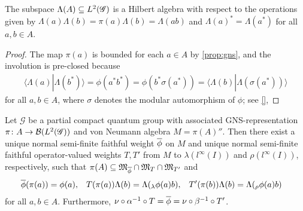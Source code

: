\begin{Lem} \label{lemma:hilbert-algebra}
  The subspace $\Lambda(A) \subseteq L^{2}(\mathscr{G})$ is a Hilbert algebra with
  respect to the operations given by
  $\Lambda(a)\Lambda(b)=\pi(a)\Lambda(b)=\Lambda(ab)$ and
  $\Lambda(a)^{*}= \Lambda(a^{*})$ for all $a,b\in A$.
\end{Lem}
\begin{proof}
  The map $\pi(a)$ is bounded for each $a \in A$ by \ref{prop:gns},
  and the involution is pre-closed because
  \begin{align*}
    \langle \Lambda(a)|\Lambda(b^{*})\rangle = \phi(a^{*}b^{*}) =
    \phi(b^{*}\sigma(a^{*})) = \langle
    \Lambda(b)|\Lambda(\sigma(a^{*}))\rangle
  \end{align*}
  for all $a,b \in A$, where $\sigma$ denotes the modular automorphism
  of $\phi$; see \ref{},
\end{proof}
\begin{Prop}
  Let $\mathscr{G}$ be a partial compact quantum group 
with associated GNS-representation $\pi \colon A \to {\cal B}(L^{2}(\mathscr{G}))$
and von Neumann algebra $M=\pi(A)''$. Then
  there exist a unique normal semi-finite faithful weight $\overline{\phi}$ on
  $M$ and unique normal semi-finite faithful
  operator-valued weights $T,T'$ from $M$ to
  $\lambda(l^{\infty}(I))$ and $\rho(l^{\infty}(I))$, respectively,
  such that $\pi(A) \subseteq \mathfrak{M}_{\overline{\phi}} \cap
  \mathfrak{M}_{T} \cap \mathfrak{M}_{T'}$ and
  \begin{align}\label{eq:vnphi}
    \overline{\phi}(\pi(a))&= \phi(a), &
    T(\pi(a))\Lambda(b) &= \Lambda(_{\lambda}\phi(a)b), &
    T'(\pi(b))\Lambda(b) &= \Lambda(_{\rho}\phi(a)b)        
  \end{align}
  for all $a,b\in A$. Furthermore, $\nu \circ \alpha^{-1} \circ T = \overline{\phi} =
  \nu \circ \beta^{-1} \circ T'$. 
\end{Prop}
